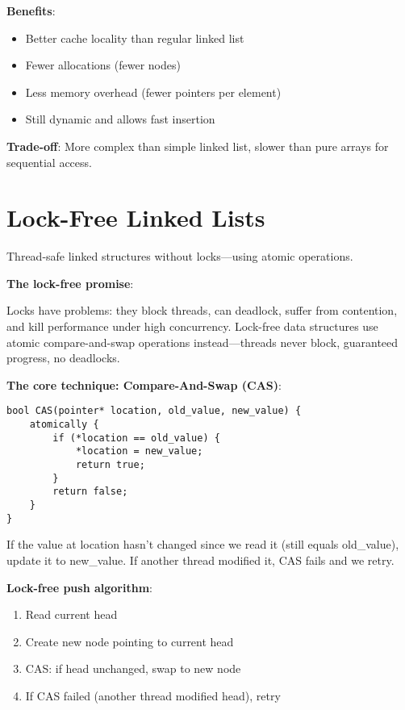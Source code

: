 \textbf{Benefits}:

\begin{itemize}
    \item Better cache locality than regular linked list
    \item Fewer allocations (fewer nodes)
    \item Less memory overhead (fewer pointers per element)
    \item Still dynamic and allows fast insertion
\end{itemize}

\textbf{Trade-off}: More complex than simple linked list, slower than pure arrays for sequential access.

\section{Lock-Free Linked Lists}

Thread-safe linked structures without locks—using atomic operations.

\textbf{The lock-free promise}:

Locks have problems: they block threads, can deadlock, suffer from contention, and kill performance under high concurrency. Lock-free data structures use atomic compare-and-swap operations instead—threads never block, guaranteed progress, no deadlocks.

\textbf{The core technique: Compare-And-Swap (CAS)}:

\begin{verbatim}
bool CAS(pointer* location, old_value, new_value) {
    atomically {
        if (*location == old_value) {
            *location = new_value;
            return true;
        }
        return false;
    }
}
\end{verbatim}

If the value at location hasn't changed since we read it (still equals old\_value), update it to new\_value. If another thread modified it, CAS fails and we retry.

\textbf{Lock-free push algorithm}:
\begin{enumerate}
    \item Read current head
    \item Create new node pointing to current head
    \item CAS: if head unchanged, swap to new node
    \item If CAS failed (another thread modified head), retry
\end{enumerate}

